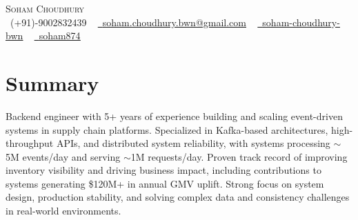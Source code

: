 \documentclass[letterpaper,11pt]{article}
\begin{document}

\begin{center}
    {\Huge \scshape Soham Choudhury} \\ \vspace{1pt}
    \small \raisebox{-0.1\height}\faPhone\ (+91)-9002832439 ~ \href{mailto:soham.choudhury.bwn@gmail.com}{\raisebox{-0.2\height}\faEnvelope\  \underline{soham.choudhury.bwn@gmail.com}} ~
    \href{https://www.linkedin.com/in/soham-choudhury-bwn/}{\raisebox{-0.2\height}\faLinkedin\ \underline{soham-choudhury-bwn}}  ~
    \href{https://github.com/soham874}{\raisebox{-0.2\height}\faGithub\ \underline{soham874}}
    \vspace{-8pt}
\end{center}


\section{Summary}
\begin{itemize}[leftmargin=0.15in, label={}]
\small{\item{
\justifying
Backend engineer with 5+ years of experience building and scaling event-driven systems in supply chain platforms. Specialized in Kafka-based architectures, high-throughput APIs, and distributed system reliability, with systems processing $\sim$5M events/day and serving $\sim$1M requests/day. Proven track record of improving inventory visibility and driving business impact, including contributions to systems generating \$120M+ in annual GMV uplift. Strong focus on system design, production stability, and solving complex data and consistency challenges in real-world environments.
}}
\end{itemize}
\vspace{-16pt}
\end{document}
